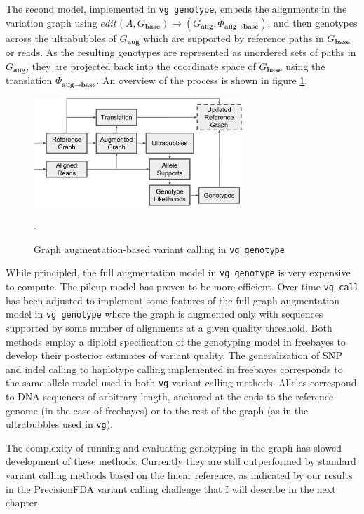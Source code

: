 \documentclass[a4paper,12pt,numbered,oneside]{Classes/PhDThesisPSnPDF}
\begin{document}
The second model, implemented in {\tt vg genotype}, embeds the alignments in the variation graph using $edit(A, G_\textbf{base}) \to (G_\textbf{aug}, \Phi_{\textbf{aug}\to\textbf{base}})$, and then genotypes across the ultrabubbles of $G_\textbf{aug}$ which are supported by reference paths in $G_\textbf{base}$ or reads.
As the resulting genotypes are represented as unordered sets of paths in $G_\textbf{aug}$, they are projected back into the coordinate space of $G_\textbf{base}$ using the translation $\Phi_{\textbf{aug}\to\textbf{base}}$.
An overview of the process is shown in figure \ref{fig:vg_genotype}.

\begin{figure}[htbp!]
  \centering
  \includegraphics[width=0.7\textwidth]{Chapter2/Figs/vg_genotype.pdf}
  \caption{
    Graph augmentation-based variant calling in {\tt vg genotype}
    }
  \label{fig:vg_genotype}.
\end{figure}

While principled, the full augmentation model in {\tt vg genotype} is very expensive to compute.
The pileup model has proven to be more efficient.
Over time {\tt vg call} has been adjusted to implement some features of the full graph augmentation model in {\tt vg genotype} where the graph is augmented only with sequences supported by some number of alignments at a given quality threshold.
Both methods employ a diploid specification of the genotyping model in freebayes \cite{garrison2012haplotype} to develop their posterior estimates of variant quality.
The generalization of SNP and indel calling to haplotype calling implemented in freebayes corresponds to the same allele model used in both {\tt vg} variant calling methods.
Alleles correspond to DNA sequences of arbitrary length, anchored at the ends to the reference genome (in the case of freebayes) or to the rest of the graph (as in the ultrabubbles used in {\tt vg}).

The complexity of running and evaluating genotyping in the graph has slowed development of these methods.
Currently they are still outperformed by standard variant calling methods based on the linear reference, as indicated by our results in the PrecisionFDA variant calling challenge that I will describe in the next chapter.
\end{document}
